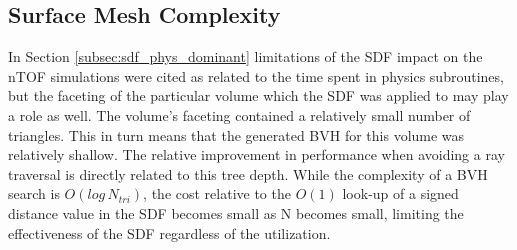 \subsection{Surface Mesh Complexity}\label{subsec:sdf_tree_depth}

In Section \ref{subsec:sdf_phys_dominant} limitations of the SDF impact on the
nTOF simulations were cited as related to the time spent in physics subroutines,
but the faceting of the particular volume which the SDF was applied to may play
a role as well. The volume's faceting contained a relatively small number of
triangles. This in turn means that the generated BVH for this volume was
relatively shallow. The relative improvement in performance when avoiding a ray
traversal is directly related to this tree depth. While the complexity of a BVH
search is $O(log\, N_{tri})$, the cost relative to the $O(1)$ look-up of a signed
distance value in the SDF becomes small as N becomes small, limiting the
effectiveness of the SDF regardless of the utilization.
